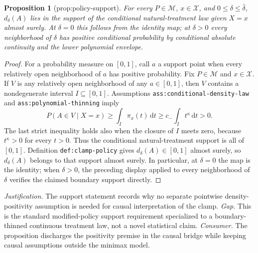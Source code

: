 \documentclass{article}
\newtheorem{proposition}{Proposition}
\begin{document}
\begin{proposition}[prop:policy-support]\label{prop:policy-support}
For every \(P\in\mathcal M\), \(x\in\mathcal X\), and \(0\leq\delta\leq\bar\delta\), \(d_\delta(A)\) lies in the support of the conditional natural-treatment law given \(X=x\) almost surely. At \(\delta=0\) this follows from the identity map; at \(\delta>0\) every neighborhood of \(\delta\) has positive conditional probability by conditional absolute continuity and the lower polynomial envelope.
\end{proposition}
\begin{proof}
For a probability measure on \([0,1]\), call \(a\) a support point when every relatively open neighborhood of \(a\) has positive probability.  Fix \(P\in\mathcal M\) and \(x\in\mathcal X\).  If \(V\) is any relatively open neighborhood of any \(a\in[0,1]\), then \(V\) contains a nondegenerate interval \(I\subseteq[0,1]\).  Assumptions \texttt{ass:conditional-density-law} and \texttt{ass:polynomial-thinning} imply
\[
 P(A\in V\mid X=x)
 \geq \int_I\pi_x(t)\,\mathrm dt
 \geq c_-\int_I t^\kappa\,\mathrm dt>0.
\]
The last strict inequality holds also when the closure of \(I\) meets zero, because \(t^\kappa>0\) for every \(t>0\).  Thus the conditional natural-treatment support is all of \([0,1]\).  Definition \texttt{def:clamp-policy} gives \(d_\delta(A)\in[0,1]\) almost surely, so \(d_\delta(A)\) belongs to that support almost surely.  In particular, at \(\delta=0\) the map is the identity; when \(\delta>0\), the preceding display applied to every neighborhood of \(\delta\) verifies the claimed boundary support directly.
\end{proof}
\par\smallskip\noindent \textit{Justification.} The support statement records why no separate pointwise density-positivity assumption is needed for causal interpretation of the clamp. \textit{Gap.} This is the standard modified-policy support requirement specialized to a boundary-thinned continuous treatment law, not a novel statistical claim. \textit{Consumer.} The proposition discharges the positivity premise in the causal bridge while keeping causal assumptions outside the minimax model.
\end{document}
